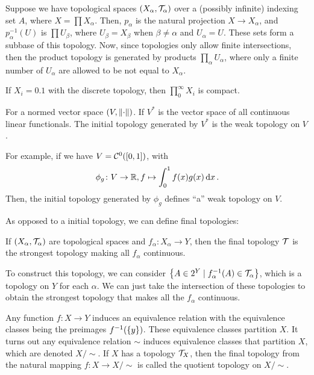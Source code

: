 \begin{definition}
    Suppose we have topological spaces $(X_\alpha, \mathcal T_\alpha)$ over a (possibly infinite) indexing set $A$, where $X = \prod X_\alpha$. Then, $p_\alpha$ is the natural projection $X \to X_\alpha$, and $p_\alpha^{-1}(U)$ is $\prod U_\beta$, where $U_\beta = X_\beta$ when $\beta \ne \alpha$ and $U_\alpha = U$. These sets form a subbase of this topology. Now, since topologies only allow finite intersections, then the product topology is generated by products $\prod_\alpha U_\alpha$, where only a finite number of $U_\alpha$ are allowed to be not equal to $X_\alpha$.
\end{definition}

\begin{example}
    If $X_i = \qty{0, 1}$ with the discrete topology, then $\prod_0^\infty X_i$ is compact.
\end{example}

\begin{definition}
    For a normed vector space $(V, \norm{\cdot})$. If $V^*$ is the vector space of all continuous linear functionals. The initial topology generated by $V^*$ is the weak topology on $V$.    
\end{definition}

\begin{example}
    For example, if we have $V = \mathcal C^0([0, 1])$, with \[\phi_g\colon V \to \mathbb R, f \mapsto \int_0^1 f(x)g(x) \dd{x}.\] Then, the initial topology generated by $\phi_g$ defines ``a'' weak topology on $V$.
\end{example}

As opposed to a initial topology, we can define final topologies:
\begin{definition}
    If $(X_\alpha, \mathcal T_\alpha)$ are topological spaces and $f_\alpha \colon X_\alpha \to Y$, then the final topology $\mathcal T$ is the strongest topology making all $f_\alpha$ continuous.
\end{definition}

To construct this topology, we can consider $\qty{A \in 2^Y \mid f_\alpha^{-1}(A) \in \mathcal T_\alpha}$, which is a topology on $Y$ for each $\alpha$. We can just take the intersection of these topologies to obtain the strongest topology that makes all the $f_\alpha$ continuous.

\begin{example}
    Any function $f \colon X \to Y$ induces an equivalence relation with the equivalence classes being the preimages $f^{-1}(\qty{y})$. These equivalence classes partition $X$. It turns out any equivalence relation $\sim$ induces equivalence classes that partition $X$, which are denoted $X/\!\sim$. If $X$ has a topology $\mathcal T_X$, then the final topology from the natural mapping $f \colon X \to X/\!\sim$ is called the quotient topology on $X/\!\sim$.
\end{example}

